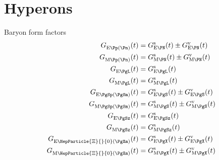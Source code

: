 \documentclass[a4paper,draft]{article}
\newcommand*{\m}[1]{\mathrm {#1}}
\newcommand*{\nn}{\nonumber}
\newcommand*{\G}[3][G]{\ensuremath{#1_{\m{#2}}^{\m{#3}}}}
\DeclareRobustCommand{\PgXz}{\HepParticle{\Xi}{}{0}\xspace}
\begin{document}
\section{Hyperons}

Baryon form factors
\begin{align}
\G{E\Pp(\Pn)}{}(t)&=\G{E\PN}{s}(t)\pm\G{E\PN}{v}(t)\nn\\
\G{M\Pp(\Pn)}{}(t)&=\G{M\PN}{s}(t)\pm\G{M\PN}{v}(t)\nn\\
\G{E\PgL}{}(t)&=\G{E\PgL}{s}(t)\nn\\
\G{M\PgL}{}(t)&=\G{M\PgL}{s}(t)\nn\\
\G{E\PgSp(\PgSm)}{}(t)&=\G{E\PgS}{s}(t)\pm\G{E\PgS}{v}(t)\nn\\
\G{M\PgSp(\PgSm)}{}(t)&=\G{M\PgS}{s}(t)\pm\G{M\PgS}{v}(t)\nn\\
\G{E\PgSz}{}(t)&=\G{E\PgSz}{s}(t)\nn\\
\G{M\PgSz}{}(t)&=\G{M\PgSz}{s}(t)\nn\\
\G{E\PgXz(\PgXm)}{}(t)&=\G{E\PgX}{s}(t)\pm\G{E\PgX}{v}(t)\nn\\
\G{M\PgXz(\PgXm)}{}(t)&=\G{M\PgX}{s}(t)\pm\G{M\PgX}{v}(t)
\end{align}
\end{document}
